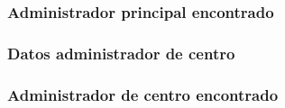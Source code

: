   

  \subsubsection{Administrador principal encontrado}

  

  \subsubsection{Datos administrador de centro}

  

  \subsubsection{Administrador de centro encontrado}

  